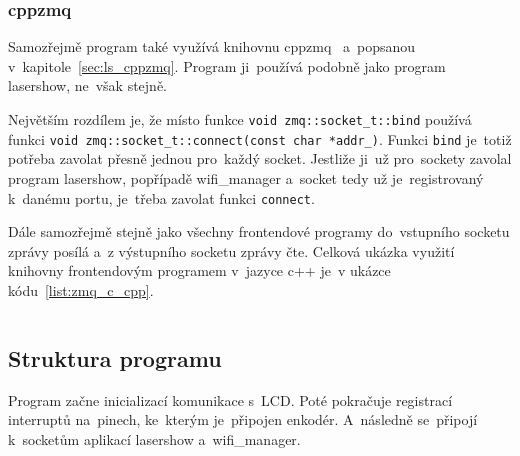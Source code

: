 \subsubsection{cppzmq}
Samozřejmě program také využívá knihovnu cppzmq~\cite{cppzmq}  a~popsanou  v~kapitole~\ref{sec:ls_cppzmq}. Program ji~používá podobně jako program lasershow, ne~však stejně.

Největším rozdílem je, že místo funkce \texttt{void zmq::socket_t::bind} používá funkci \texttt{void zmq::socket_t::connect(const char *addr_)}.
Funkci \texttt{bind} je~totiž potřeba zavolat přesně jednou  pro~každý socket.
Jestliže ji~už  pro~sockety zavolal program lasershow, popřípadě wifi\_manager  a~socket tedy už je~registrovaný  k~danému portu, je~třeba zavolat funkci \texttt{connect}.

Dále samozřejmě stejně jako všechny frontendové programy do~vstupního socketu zprávy posílá  a~z výstupního socketu zprávy čte. Celková ukázka využití knihovny frontendovým programem  v~jazyce c++  je~v ukázce kódu~\ref{list:zmq_c_cpp}.

\begin{code}
    \inputminted[frame=lines,fontsize=\footnotesize{}, linenos, breaklines]{cpp}{code_examples/zmq_client.cpp}
\end{code}

\subsection{Struktura programu}
Program začne inicializací komunikace  s~LCD.
Poté pokračuje registrací interruptů na~pinech, ke~kterým je~připojen enkodér.  A~následně se~připojí  k~socketům aplikací lasershow  a~wifi\_manager.

